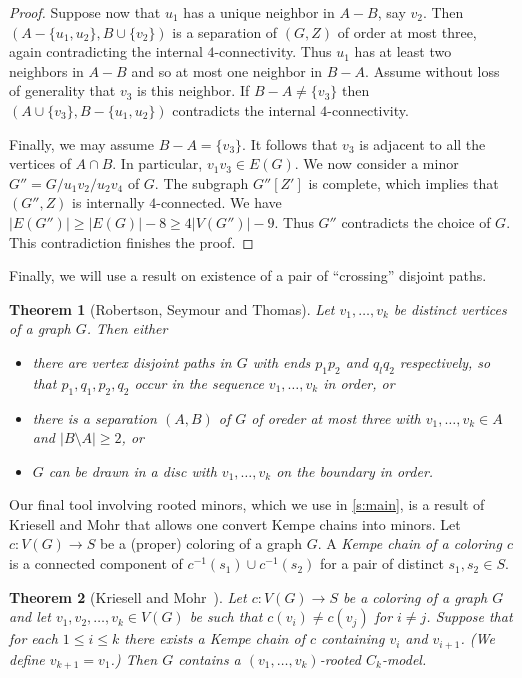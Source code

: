\documentclass[reqno,final,12pt]{amsart}
\newtheorem{thm}{Theorem}
\begin{document}
{\begin{proof}
	Suppose now that $u_1$ has a unique neighbor in $A-B$, say $v_2$. Then $(A-\{u_1,u_2\},B \cup \{v_2\})$ is a separation of $(G,Z)$ of order at most three, again contradicting the internal $4$-connectivity. Thus $u_1$ has at least two neighbors in $A-B$ and so at most one neighbor in $B-A$. Assume without loss of generality that $v_3$ is this neighbor. If $B-A \neq \{v_3\}$ then $(A \cup \{v_3\},B -\{u_1,u_2\})$ contradicts the internal $4$-connectivity. 
	
	Finally, we may assume  $B-A = \{v_3\}$. It follows that $v_3$ is adjacent to all the vertices of $A\cap B$. In particular, $v_1v_3 \in E(G)$. We now consider a minor $G'' = G /u_1v_2 / u_2v_4$ of $G$. The subgraph $G''[Z']$ is complete, which implies that $(G'',Z)$ is  internally $4$-connected. We have $|E(G'')| \geq |E(G)|-8 \geq 4|V(G'')|-9.$ Thus $G''$ contradicts the choice of $G$. This contradiction finishes the proof.   
	\end{proof}



Finally, we will use a result on existence of a pair of ``crossing'' disjoint paths. 

\begin{thm}[Robertson, Seymour and Thomas{\cite[(2.4)]{RST1993}}]
\label{l:RST24}
Let $v_1, \dots, v_k$ be distinct vertices of a graph $G$. Then either
\begin{itemize}
	\item[(i)] there are vertex disjoint paths in $G$ with ends $p_1 p_2$ and $q_l q_2$ respectively, so that $p_1, q_1, p_2, q_2$ occur in the sequence $v_1, \dots, v_k$ in order, or
	\item[(ii)] there is a separation $(A,B)$ of $G$ of oreder at most three with $v_1, \dots, v_k \in A$ and $|B \setminus A| \geq 2$, or
	\item[(iii)] $G$ can be drawn in a disc with $v_1, \dots, v_k$ on the boundary in order.
\end{itemize}
\end{thm}

Our final tool involving rooted minors, which we use in \cref{s:main}, is a result of Kriesell and Mohr that allows one convert Kempe chains into minors. Let $c: V(G) \to S$ be a (proper) coloring of a graph $G$.  A \emph {Kempe chain of a coloring $c$} is a connected component of $c^{-1}(s_1) \cup c^{-1}(s_2)$ for a pair of distinct $s_1,s_2 \in S$.   

\begin{thm}[Kriesell and Mohr~{\cite[Lemma 2]{KM2019}}]	\label{t:KM2019} Let  $c: V(G) \to S$ be a coloring of a graph $G$ and let $v_1,v_2,\ldots,v_k \in V(G)$ be such that $c(v_i) \neq c(v_j)$ for $i \neq j$. Suppose that for each $1 \leq  i \leq k$ there exists a Kempe chain of $c$ containing $v_{i}$ and $v_{i+1}$. (We define $v_{k+1}=v_1$.)  Then $G$ contains a $(v_1,\ldots,v_k)$-rooted $C_k$-model.
\end{thm}	

}
\end{document}
